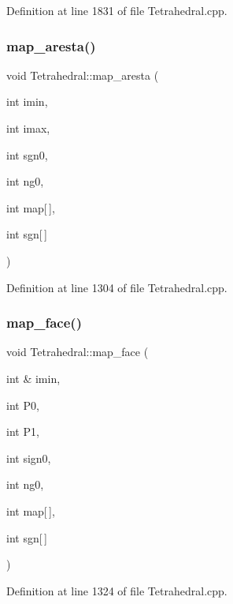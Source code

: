 Definition at line 1831 of file Tetrahedral.\+cpp.

\mbox{\label{classTetrahedral_ae062b912f6356640d54700035b3ec75e}} 
\subsubsection{\texorpdfstring{map\+\_\+aresta()}{map\_aresta()}}
{\footnotesize\ttfamily void Tetrahedral\+::map\+\_\+aresta (\begin{DoxyParamCaption}\item[{int}]{imin,  }\item[{int}]{imax,  }\item[{int}]{sgn0,  }\item[{int}]{ng0,  }\item[{int}]{map\mbox{[}$\,$\mbox{]},  }\item[{int}]{sgn\mbox{[}$\,$\mbox{]} }\end{DoxyParamCaption})}



Definition at line 1304 of file Tetrahedral.\+cpp.

\mbox{\label{classTetrahedral_a3db10cbcaa2306d1be9656c04c9e9366}} 
\subsubsection{\texorpdfstring{map\+\_\+face()}{map\_face()}}
{\footnotesize\ttfamily void Tetrahedral\+::map\+\_\+face (\begin{DoxyParamCaption}\item[{int \&}]{imin,  }\item[{int}]{P0,  }\item[{int}]{P1,  }\item[{int}]{sign0,  }\item[{int}]{ng0,  }\item[{int}]{map\mbox{[}$\,$\mbox{]},  }\item[{int}]{sgn\mbox{[}$\,$\mbox{]} }\end{DoxyParamCaption})}



Definition at line 1324 of file Tetrahedral.\+cpp.



